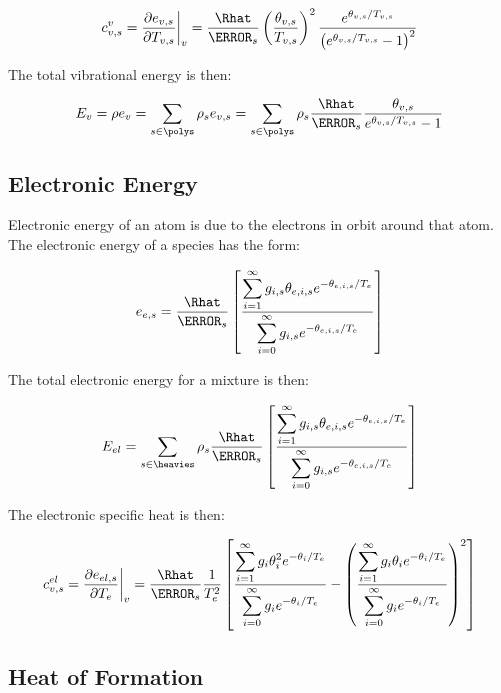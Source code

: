 \documentclass[10pt]{article}
\begin{document}
\begin{flushleft}
\begin{equation*}
    c_{v,s}^v = \pd{e_{v,s}}{T_{v,s}}\bigg|_v = \frac{\Rhat}{\MW_s} \bp{\frac{\theta_{v,s}}{T_{v,s}}}^2 \frac{e^{\theta_{v,s}/T_{v,s}}}{\bp{e^{\theta_{v,s} / T_{v,s}} -1}^2}
\end{equation*}

The total vibrational energy is then:

\begin{equation*}
    E_v = \rho e_v = \sum_{s \in \polys} \rho_s e_{v,s} = \sum_{s \in \polys} \rho_s \frac{\Rhat}{\MW_s} \frac{\theta_{v,s}}{e^{\theta_{v,s} / T_{v,s}} - 1} 
    \label{eq:vib-energy}
\end{equation*}

\subsection{Electronic Energy}

Electronic energy of an atom is due to the electrons in orbit around that atom. The electronic energy of a species has the form:

\begin{equation*}
    e_{e,s} = \frac{\Rhat}{\MW_s} \bb{\frac{\displaystyle\sum_{i=1}^\infty g_{i,s} \theta_{e,i,s} e^{-\theta_{e,i,s}/ T_e}}{\displaystyle\sum_{i=0}^\infty g_{i,s} e^{- \theta_{e,i,s} / T_e}}}
\end{equation*}

The total electronic energy for a mixture is then:

\begin{equation*}
    E_{el} = \sum_{s \in \heavies} \rho_s \frac{\Rhat}{\MW_s} \bb{\frac{\displaystyle\sum_{i=1}^\infty g_{i,s} \theta_{e,i,s} e^{-\theta_{e,i,s}/ T_e}}{\displaystyle\sum_{i=0}^\infty g_{i,s} e^{- \theta_{e,i,s} / T_e}}}
    \label{eq:el-energy}
\end{equation*}

The electronic specific heat is then:

\begin{equation*}
    c_{v,s}^{el} = \pd{e_{el,s}}{T_e}\bigg|_v = \frac{\Rhat}{\MW_s} \frac{1}{T_e^2} \bb{\frac{\displaystyle\sum_{i=1}^\infty g_{i} \theta_{i}^2 e^{-\theta_{i}/ T_e}}{\displaystyle\sum_{i=0}^\infty g_{i} e^{- \theta_{i} / T_e}} - \bp{\frac{\displaystyle\sum_{i=1}^\infty g_{i} \theta_{i} e^{-\theta_{i}/ T_e}}{ \displaystyle\sum_{i=0}^\infty g_{i} e^{- \theta_{i} / T_e}} }^2}
\end{equation*}

\subsection{Heat of Formation}


\end{flushleft}
\end{document}
